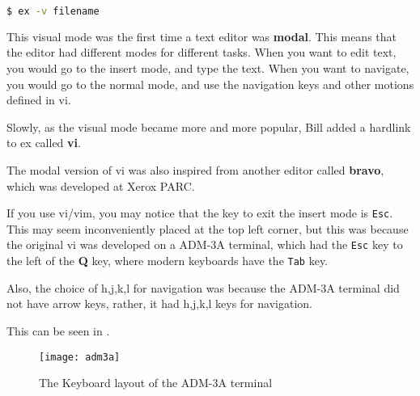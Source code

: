 \begin{lstlisting}[language=bash]
$ ex -v filename
\end{lstlisting}

This visual mode was the first time a text editor
was \textbf{modal}.
This means that the editor had different modes for different tasks.
When you want to edit text, you would go to the insert mode,
and type the text.
When you want to navigate, you would go to the normal mode,
and use the navigation keys and other motions defined in vi.

Slowly, as the visual mode became more and more popular,
Bill added a hardlink to ex called \textbf{vi}.

The modal version of vi was also inspired from another
editor called \textbf{bravo}, which was developed at Xerox PARC.

If you use vi/vim, you may notice that the key to
exit the insert mode is \lstinline|Esc|.
This may seem inconveniently placed at the top left corner,
but this was because the original vi was developed on a
ADM-3A terminal, which had the \lstinline|Esc| key to the left
of the \textbf{Q} key, where modern keyboards have the \lstinline|Tab| key.

Also, the choice of h,j,k,l for navigation was because
the ADM-3A terminal did not have arrow keys,
rather, it had h,j,k,l keys for navigation.

This can be seen in .

\begin{figure}[h!]
  \texttt{[image: adm3a]}
  \caption{The Keyboard layout of the ADM-3A terminal}
\end{figure}


